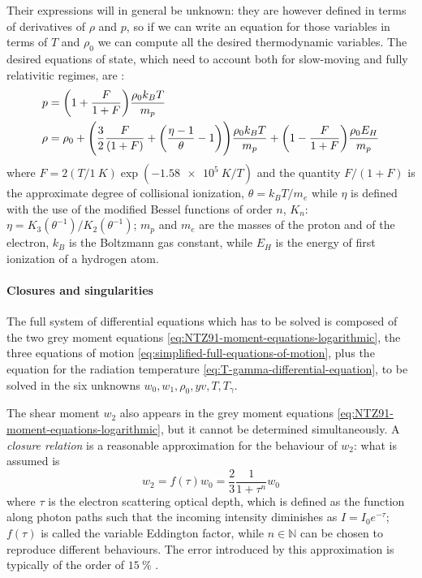 \documentclass[main.tex]{subfiles}
\begin{document}
Their expressions will in general be unknown: they are however defined in terms of derivatives of \(\rho\) and \(p\), so if we can write an equation for those variables in terms of \(T\) and \(\rho_0\) we can compute all the desired thermodynamic variables. The desired equations of state, which need to account both for slow-moving and fully relativitic regimes, are \cite[eqs. 16]{NobiliTurollaZampieri:1991dec}:
%
\begin{subequations}
\begin{align}
  p &= \qty(1 + \frac{F}{1+F}) \frac{\rho_0 k_B T}{m_p}  \\
  \rho &= \rho_0 +  \qty( \frac{3}{2} \frac{F}{(1+F)} + \qty(\frac{\eta-1}{\theta} - 1)) \frac{\rho_0 k_B T}{m_p} + \qty(1 - \frac{F}{1+F} ) \frac{\rho_0 E_H}{m_p}
\end{align}
\end{subequations}
%
where \(F = 2 (T/\SI{1}{K}) \exp(\SI{-1.58e5}{K}/T)\) and the quantity \(F/(1+F)\) is the approximate degree of collisional ionization, \(\theta = k_B T / m_e\) while \(\eta\) is defined with the use of the modified Bessel functions of order \(n\), \(K_n\):  \(\eta = K_3 (\theta^{-1}) / K_2 (\theta^{-1})\); \(m_p\) and \(m_e\) are the masses of the proton and of the electron, \(k_B\) is the Boltzmann gas constant, while \(E_H\) is the energy of first ionization of a hydrogen atom.

\paragraph{Closures and singularities} \label{sec:closures-singularities}

The full system of differential equations which has to be solved is composed of the two grey moment equations \eqref{eq:NTZ91-moment-equations-logarithmic}, the three equations of motion \eqref{eq:simplified-full-equations-of-motion}, plus the equation for the radiation temperature \eqref{eq:T-gamma-differential-equation}, to be solved in the six unknowns \(w_0, w_1, \rho_0, yv, T, T_\gamma\).

The shear moment \(w_2\) also appears in the grey moment equations \eqref{eq:NTZ91-moment-equations-logarithmic}, but it cannot be determined simultaneously. A \emph{closure relation} is a reasonable approximation for the behaviour of \(w_2\): what is assumed is
%
\begin{equation}
  w_2 = f(\tau) w_0 = \frac{2}{3} \frac{1}{1+ \tau^n} w_0
\end{equation}
%
where \(\tau\) is the electron scattering optical depth, which is defined \cite[eqs. 1.25, 1.26]{RybickiLightman:2004} as the function along photon paths such that the incoming intensity diminishes as \(I = I_0 e^{-\tau}\); \(f(\tau)\) is called the variable Eddington factor, while \(n \in \mathbb N\) can be chosen to reproduce different behaviours.
The error introduced by this approximation is typically of the order of \(\SI{15}{\percent}\) \cite[]{TurollaNobili:1988}.
\end{document}
